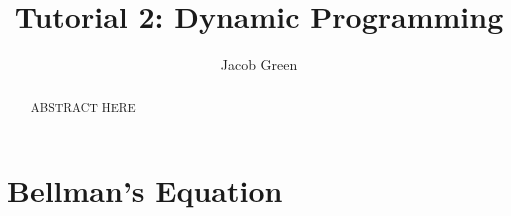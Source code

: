 \documentclass[12pt]{article}
\title{Tutorial 2: Dynamic Programming}
\author{Jacob Green}
\date{}
\begin{document}
 

\begin{titlepage}
    \maketitle
    \begin{abstract}
    ABSTRACT HERE
\end{abstract}
\end{titlepage}

\newpage

\section{Bellman's Equation}
\end{document}
